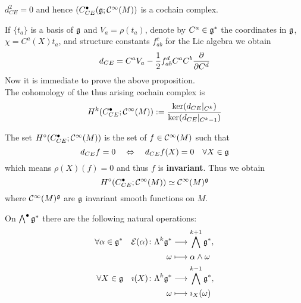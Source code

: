 \begin{prop}
  $d_{CE}^2 = 0$ and hence $(C_{CE}^\bullet(\mathfrak{g} ; \mathcal{C}^{\infty}(M))$ is a cochain complex.
\end{prop}

If $\{t_a\}$ is a basis of $\mathfrak{g}$ and $V_a = \rho(t_a)$, denote by $C^a \in \mathfrak{g}^*$ the coordinates in $\mathfrak{g}$, $\chi= C^a(X) t_a$, and structure constants $f_{ab}^c$ for the Lie algebra we obtain
$$ d_{CE} = C^a V_a - \frac{1}{2} f^d_{ab} C^a C^b \frac{\partial }{\partial C^d} $$
Now it is immediate to prove the above proposition.\\

The cohomology of the thus arising cochain complex is
$$ H^k(C_{CE}^\bullet; \mathcal{C}^{\infty}(M)) := \frac{\ker(d_{CE}|_{C^k})}{\ker(d_{CE}|_{C^k-1})} $$

\begin{rem}
  The set $H^\circ (C_{CE}^\bullet; \mathcal{C}^{\infty}(M))$ is the set of $f \in \mathcal{C}^{\infty}(M)$ such that
  $$ d_{CE} f = 0 \quad \Leftrightarrow \quad d_{CE} f(X) = 0 \quad \forall X\in \mathfrak{g} $$
  which means $\rho(X)(f) = 0$ and thus $f$ is \textbf{invariant}. Thus we obtain
  $$ H^\circ (C_{CE}^\bullet; \mathcal{C}^{\infty}(M)) \simeq \mathcal{C}^{\infty}(M)^{\mathfrak{g}} $$
  where $\mathcal{C}^{\infty}(M)^{\mathfrak{g}}$ are $\mathfrak{g}$ invariant smooth functions on $M$.
\end{rem}

On $\bigwedge^\bullet \mathfrak{g}^*$ there are the following natural operations:
\begin{align*}
  \forall \alpha \in \mathfrak{g}^* \quad \mathcal{E}(\alpha) \colon \Lambda^k \mathfrak{g}^* &\longrightarrow \bigwedge^{k+1} \mathfrak{g}^*, \\
  \omega &\longmapsto \alpha \wedge \omega \\
  \forall X \in \mathfrak{g} \quad \imath(X) \colon \Lambda^k \mathfrak{g}^* &\longrightarrow \bigwedge^{k-1} \mathfrak{g}^*, \\
  \omega &\longmapsto \imath_X (\omega)
\end{align*}

